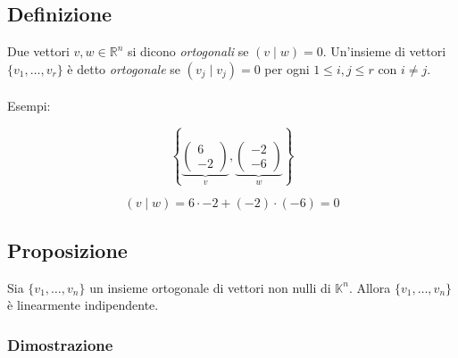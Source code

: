 \documentclass[12pt]{article}
\begin{document}
\subsection{Definizione}

Due vettori $v, w \in \mathbb{R}^n$ si dicono \textit{ortogonali} se $(v \mid w) = 0$. Un'insieme di vettori $\{v_1, \dots, v_r\}$ è detto \textit{ortogonale} se $(v_j \mid v_j) = 0$ per ogni $1 \le i, j \le r$ con $i \neq j$.\\\\
Esempi:

\[\left\{\underbrace{\begin{pmatrix}
    6\\
    -2
\end{pmatrix}}_{v}, \underbrace{\begin{pmatrix}
    -2\\
    -6
\end{pmatrix}}_{w}\right\}\]


\begin{figure}[H]
\centering
{}
\end{figure}

\[(v \mid w) = 6 \cdot -2 + (-2) \cdot (-6) = 0\]

\subsection{Proposizione}

Sia $\{v_1, \dots, v_n\}$ un insieme ortogonale di vettori non nulli di $\mathbb{K}^n$. Allora $\{v_1, \dots, v_n\}$ è linearmente indipendente.

\subsubsection{Dimostrazione}
\end{document}

